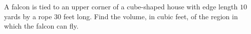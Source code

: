 A falcon is tied to an upper corner of a cube-shaped house with edge length $10$ yards by a rope $30$ feet long. Find the volume, in cubic feet, of the region in which the falcon can fly.
